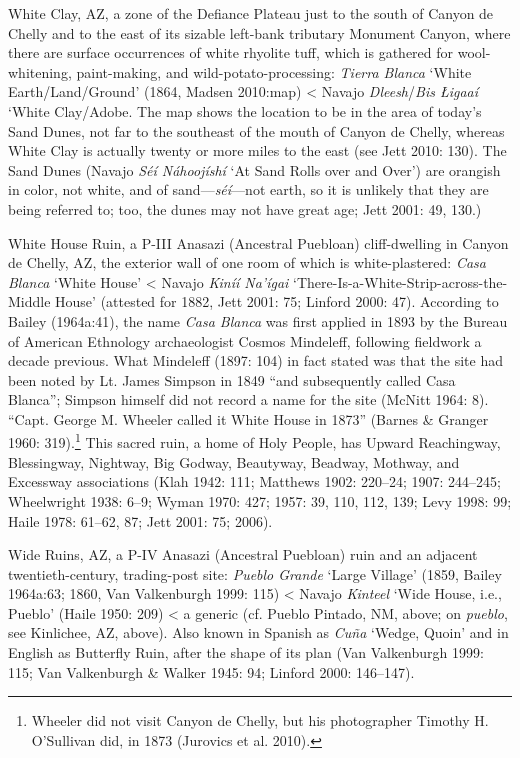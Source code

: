 White Clay, AZ, a zone of the Defiance Plateau just to the south of Canyon de Chelly and to the east of its sizable left-bank tributary Monument Canyon, where there are surface occurrences of white rhyolite tuff, which is gathered for wool-whitening, paint-making, and wild-potato-processing:  \textit{Tierra Blanca} ‘White Earth/Land/Ground’ (1864, Madsen 2010:map) {\textless} Navajo \textit{Dleesh}/\textit{Bis Łigaaí} ‘White Clay/Adobe.  The map shows the location to be in the area of today’s Sand Dunes, not far to the southeast of the mouth of Canyon de Chelly, whereas White Clay is actually twenty or more miles to the east (see Jett 2010: 130).  The Sand Dunes (Navajo \textit{Séí Náhoojíshí} ‘At Sand Rolls over and Over’) are orangish in color, not white, and of sand—\textit{séí}—not earth, so it is unlikely that they are being referred to; too, the dunes may not have great age; Jett 2001: 49, 130.)

White House Ruin, a P-III Anasazi (Ancestral Puebloan) cliff-dwelling in Canyon de Chelly, AZ, the exterior wall of one room of which is white-plastered:  \textit{Casa Blanca} ‘White House’ {\textless} Navajo \textit{Kiníí Na’ígai} ‘There-Is-a-White-Strip-across-the-Middle House’ (attested for 1882, Jett 2001: 75; Linford 2000: 47).  According to Bailey (1964a:41), the name \textit{Casa Blanca} was first applied in 1893 by the Bureau of American Ethnology archaeologist Cosmos Mindeleff, following fieldwork a decade previous.  What Mindeleff (1897: 104) in fact stated was that the site had been noted by Lt. James Simpson in 1849 “and subsequently called Casa Blanca”; Simpson himself did not record a name for the site (McNitt 1964: 8).  “Capt. George M. Wheeler called it White House in 1873” (Barnes \& Granger 1960: 319).\footnote{Wheeler did not visit Canyon de Chelly, but his photographer Timothy H. O’Sullivan did, in 1873 (Jurovics et al. 2010).}  This sacred ruin, a home of Holy People, has Upward Reachingway, Blessingway, Nightway, Big Godway, Beautyway, Beadway, Mothway, and Excessway associations (Klah 1942: 111; Matthews 1902: 220–24; 1907: 244–245; Wheelwright 1938: 6–9; Wyman 1970: 427; 1957: 39, 110, 112, 139; Levy 1998: 99; Haile 1978: 61–62, 87; Jett 2001: 75; 2006).

Wide Ruins, AZ, a P-IV Anasazi (Ancestral Puebloan) ruin and an adjacent twentieth-century, trading-post site:  \textit{Pueblo Grande }‘Large Village’ (1859, Bailey 1964a:63; 1860, Van Valkenburgh 1999: 115) {\textless} Navajo \textit{Kinteel} ‘Wide House, i.e., Pueblo’ (Haile 1950: 209) {\textless} a generic (cf. Pueblo Pintado, NM, above; on \textit{pueblo}, see Kinlichee, AZ, above).  Also known in Spanish as \textit{Cuña} ‘Wedge, Quoin’ and in English as Butterfly Ruin, after the shape of its plan (Van Valkenburgh 1999: 115; Van Valkenburgh \& Walker 1945: 94; Linford 2000: 146–147).

